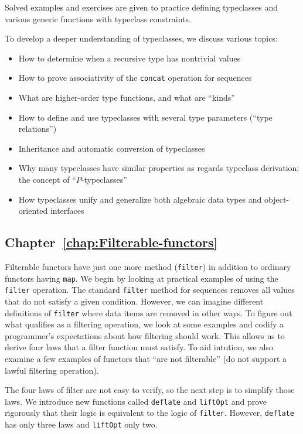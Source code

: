 Solved examples and exercises are given to practice defining typeclasses
and various generic functions with typeclass constraints.

To develop a deeper understanding of typeclasses, we discuss various
topics: 
\begin{itemize}
\item How to determine when a recursive type has nontrivial values
\item How to prove associativity of the \lstinline!concat! operation for
sequences
\item What are higher-order type functions, and what are \textsf{``}kinds\textsf{''}
\item How to define and use typeclasses with several type parameters (\textsf{``}type
relations\textsf{''})
\item Inheritance and automatic conversion of typeclasses
\item Why many typeclasses have similar properties as regards typeclass
derivation; the concept of \textsf{``}$P$-typeclasses\textsf{''}
\item How typeclasses unify and generalize both algebraic data types and
object-oriented interfaces
\end{itemize}

\subsection{Chapter~\ref{chap:Filterable-functors}}

Filterable functors have just one more method (\lstinline!filter!)
in addition to ordinary functors having \lstinline!map!. We begin
by looking at practical examples of using the \lstinline!filter!
operation. The standard \lstinline!filter! method for sequences removes
all values that do not satisfy a given condition. However, we can
imagine different definitions of \lstinline!filter! where data items
are removed in other ways. To figure out what qualifies as a filtering
operation, we look at some examples and codify a programmer\textsf{'}s expectations
about how filtering should work. This allows us to derive four laws
that a filter function must satisfy. To aid intution, we also examine
a few examples of functors that \textsf{``}are not filterable\textsf{''} (do not support
a lawful filtering operation).

The four laws of filter are not easy to verify, so the next step is
to simplify those laws. We introduce new functions called \lstinline!deflate!
and \lstinline!liftOpt! and prove rigorously that their logic is
equivalent to the logic of \lstinline!filter!. However, \lstinline!deflate!
has only three laws and \lstinline!liftOpt! only two. 

